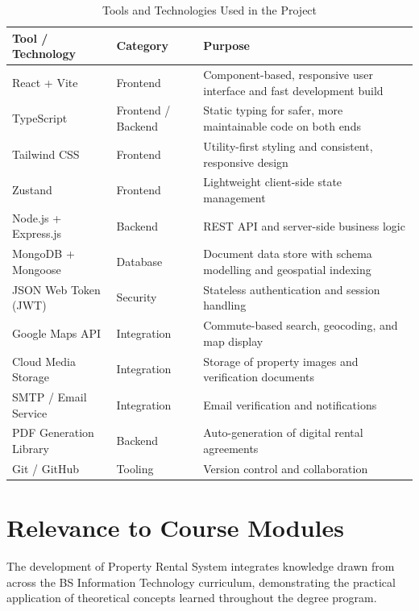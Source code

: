 \begin{table}[h!]
\centering
\caption{Tools and Technologies Used in the Project}
\renewcommand{\arraystretch}{1.3}
\begin{tabularx}{\textwidth}{|>{\raggedright\arraybackslash}p{4.2cm}|>{\raggedright\arraybackslash}p{2.8cm}|X|}
\hline
\textbf{Tool / Technology} & \textbf{Category} & \textbf{Purpose} \\
\hline
React + Vite & Frontend & Component-based, responsive user interface and fast development build \\
TypeScript & Frontend / Backend & Static typing for safer, more maintainable code on both ends \\
Tailwind CSS & Frontend & Utility-first styling and consistent, responsive design \\
Zustand & Frontend & Lightweight client-side state management \\
Node.js + Express.js & Backend & REST API and server-side business logic \\
MongoDB + Mongoose & Database & Document data store with schema modelling and geospatial indexing \\
JSON Web Token (JWT) & Security & Stateless authentication and session handling \\
Google Maps API & Integration & Commute-based search, geocoding, and map display \\
Cloud Media Storage & Integration & Storage of property images and verification documents \\
SMTP / Email Service & Integration & Email verification and notifications \\
PDF Generation Library & Backend & Auto-generation of digital rental agreements \\
Git / GitHub & Tooling & Version control and collaboration \\
\hline
\end{tabularx}
\end{table}


\section{Relevance to Course Modules}

The development of Property Rental System integrates knowledge drawn from across the BS Information Technology curriculum, demonstrating the practical application of theoretical concepts learned throughout the degree program.


